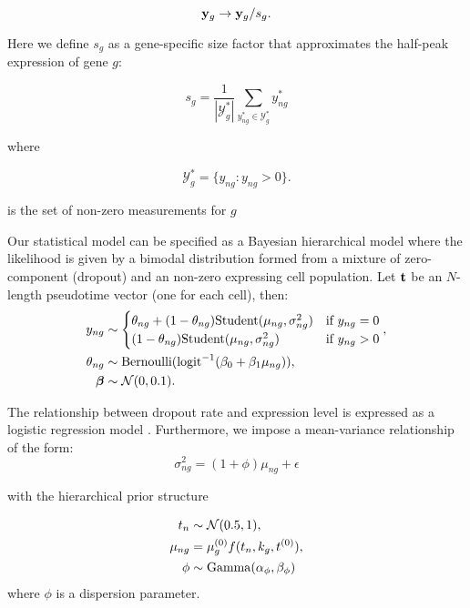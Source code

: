 \begin{equation}
\mathbf{y}_g \rightarrow \mathbf{y}_g / s_g.
\end{equation}

Here we define $s_g$ as a gene-specific size factor that approximates the half-peak expression of gene $g$:

\begin{equation}
s_g = \frac{1}{|\mathcal{Y}_g^*|} \sum_{y_{ng}^* \in \mathcal{Y}_g^*} y_{ng}^*
\end{equation}

where

\begin{equation}
\mathcal{Y}_g^* = \{ y_{ng} : y_{ng} > 0 \}.
\end{equation}

is the set of non-zero measurements for $g$

Our statistical model can be specified as a Bayesian hierarchical model where the likelihood is given by a bimodal distribution formed from a mixture of zero-component (dropout) and an non-zero expressing cell population. Let $\mathbf{t}$ be an $N$-length pseudotime vector (one for each cell), then:
\begin{align}
		y_{ng} & \sim \begin{cases}
		\theta_{ng} + (1 - \theta_{ng}) \mathrm{Student}(\mu_{ng}, \sigma^2_{ng}) & \mbox{if } y_{ng} = 0 \\
		 (1 - \theta_{ng}) \mathrm{Student}(\mu_{ng}, \sigma^2_{ng}) & \mbox{if } y_{ng} > 0
		\end{cases}, \\
		\theta_{ng} & \sim \mathrm{Bernoulli}(\mathrm{logit}^{-1} (\beta_0 + \beta_1 \mu_{ng})), \\
		\bm{\beta} & \sim \mathcal{N}(0, 0.1) .
\end{align}

The relationship between dropout rate and expression level is expressed as a logistic regression model \cite{Kharchenko2014}. Furthermore, we impose a mean-variance relationship of the form:
\begin{equation}
\sigma^2_{ng}  = (1 + \phi) \mu_{ng} + \epsilon
\end{equation}

with the hierarchical prior structure

\begin{align}
	t_n &\sim \mathcal{N}(0.5, 1), \\
	\mu_{ng} & =  \mu^{(0)}_g f(t_n, k_g, t^{(0)}), \\
	\phi & \sim \mathrm{Gamma}(\alpha_\phi, \beta_\phi)
\end{align}
where $\phi$ is a dispersion parameter. 

